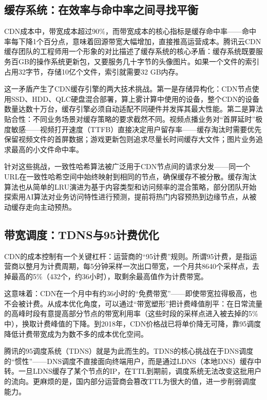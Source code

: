 \subsection{缓存系统：在效率与命中率之间寻找平衡}

CDN成本中，带宽成本超过90\%，而带宽成本的核心指标是缓存命中率——命中率每下降1个百分点，意味着回源带宽大幅增加，直接推高运营成本。腾讯云CDN缓存团队的工程师用一个形象的对比描述了缓存系统的核心矛盾：缓存系统既要服务百GB的操作系统更新包，又要服务几十字节的头像图片。如果一个文件的索引占用32字节，存储10亿个文件，索引就需要32 GB内存。

这一矛盾产生了CDN缓存引擎的两大技术挑战。第一是存储异构化：CDN节点使用SSD、HDD、QLC硬盘混合部署，算上雾计算中使用的设备，整个CDN的设备数量达数十万台，缓存引擎必须自动适配不同硬件并发挥其最大性能。第二是算法贴合性：不同业务场景对缓存策略的要求截然不同。视频点播业务对``首屏延时''极度敏感——视频打开速度（TTFB）直接决定用户留存率——缓存淘汰时需要优先保留视频文件的首屏数据；游戏更新包则追求尽量长时间缓存大文件；图片业务追求最高的小文件命中率。

针对这些挑战，一致性哈希算法被广泛用于CDN节点间的请求分发——同一个URL在一致性哈希空间中始终映射到相同的节点，确保缓存不被分散。缓存淘汰算法也从简单的LRU演进为基于内容类型和访问频率的混合策略，部分团队开始探索用AI算法对业务访问特性进行预测，提前将热门内容预热到边缘节点，从被动缓存走向主动预热。

\subsection{带宽调度：TDNS与95计费优化}

CDN的成本控制有一个关键杠杆：运营商的``95计费''规则。所谓95计费，是指运营商以整月为计费周期，每5分钟采样一次出口带宽，一个月共8640个采样点，去掉最高的5\%（432个，约36小时），取剩余最高值作为计费带宽。

这意味着：CDN在一个月中有约36小时的``免费带宽''——即使带宽拉得极高，也不会被计费。从成本优化角度，可以通过``带宽塑形''把计费峰值削平：在日常流量的高峰时段有意提高部分节点的带宽利用率（这些时段的采样点进入被去掉的5\%中），换取计费峰值的下降。到2018年，CDN价格战已将单价降无可降，靠95调度降低计费带宽成为为数不多的成本优化空间。

腾讯的95调度系统（TDNS）就是为此而生的。TDNS的核心挑战在于DNS调度的``惯性''——DNS调度不直接面向终端用户，而是通过LDNS（本地DNS）缓存中转。一旦LDNS缓存了某个节点的IP，在TTL到期前，调度系统无法改变这批用户的流向。更麻烦的是，国内部分运营商会篡改TTL为很大的值，进一步削弱调度能力。

